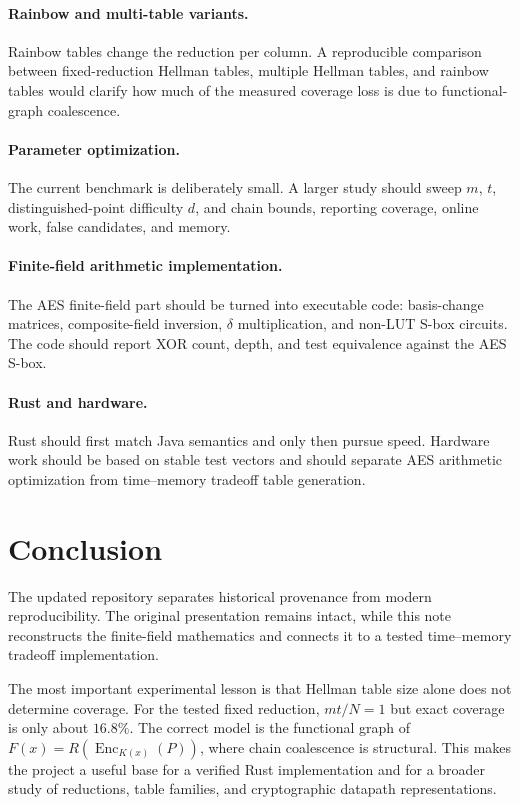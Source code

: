 \documentclass[11pt]{article}
\newcommand{\Enc}{\operatorname{Enc}}
\begin{document}
\paragraph{Rainbow and multi-table variants.}
Rainbow tables change the reduction per column.  A reproducible comparison
between fixed-reduction Hellman tables, multiple Hellman tables, and rainbow
tables would clarify how much of the measured coverage loss is due to
functional-graph coalescence.

\paragraph{Parameter optimization.}
The current benchmark is deliberately small.  A larger study should sweep
$m$, $t$, distinguished-point difficulty $d$, and chain bounds, reporting
coverage, online work, false candidates, and memory.

\paragraph{Finite-field arithmetic implementation.}
The AES finite-field part should be turned into executable code: basis-change
matrices, composite-field inversion, $\delta$ multiplication, and non-LUT
S-box circuits.  The code should report XOR count, depth, and test equivalence
against the AES S-box.

\paragraph{Rust and hardware.}
Rust should first match Java semantics and only then pursue speed.  Hardware
work should be based on stable test vectors and should separate AES arithmetic
optimization from time--memory tradeoff table generation.

\section{Conclusion}

The updated repository separates historical provenance from modern
reproducibility.  The original presentation remains intact, while this note
reconstructs the finite-field mathematics and connects it to a tested
time--memory tradeoff implementation.

The most important experimental lesson is that Hellman table size alone does
not determine coverage.  For the tested fixed reduction, $mt/N=1$ but exact
coverage is only about $16.8\%$.  The correct model is the functional graph of
$F(x)=R(\Enc_{K(x)}(P))$, where chain coalescence is structural.  This makes
the project a useful base for a verified Rust implementation and for a broader
study of reductions, table families, and cryptographic datapath
representations.
\end{document}
